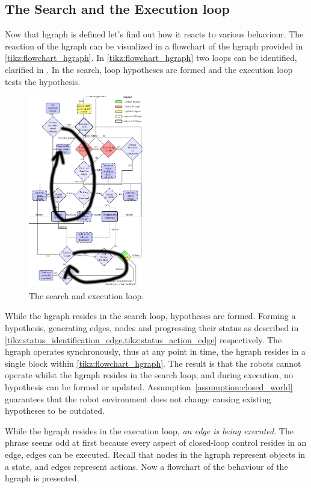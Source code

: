 \subsection{The Search and the Execution loop}%
\label{subsec:two_loops}
Now that \ac{hgraph} is defined let's find out how it reacts to various behaviour. The reaction of the \ac{hgraph} can be visualized in a flowchart of the \ac{hgraph} provided in \cref{tikz:flowchart_hgraph}. In \cref{tikz:flowchart_hgraph} two loops can be identified, clarified in . In the search, loop hypotheses are formed and the execution loop tests the hypothesis.\bs

\begin{figure}[H]
    \centering
    \includegraphics[width=5cm]{figures/two_loops_identified}
    \caption{The search and execution loop.}%
    \label{fig:two_loops_identified}
\end{figure}

While the \ac{hgraph} resides in the search loop, hypotheses are formed. Forming a hypothesis, generating edges, nodes and progressing their status as described in \cref{tikz:status_identification_edge,tikz:status_action_edge} respectively. The \ac{hgraph} operates synchronously, thus at any point in time, the \ac{hgraph} resides in a single block within \cref{tikz:flowchart_hgraph}. The result is that the robots cannot operate whilst the \ac{hgraph} resides in the search loop, and during execution, no hypothesis can be formed or updated. Assumption~\ref{assumption:closed_world} guarantees that the robot environment does not change causing existing hypotheses to be outdated.\bs

While the \ac{hgraph} resides in the execution loop, \textit{an edge is being executed}. The phrase  seems odd at first because every aspect of closed-loop control resides in an edge, edges can be executed. Recall that nodes in the \ac{hgraph} represent objects in a state, and edges represent actions. Now a flowchart of the behaviour of the \ac{hgraph} is presented.\bs

